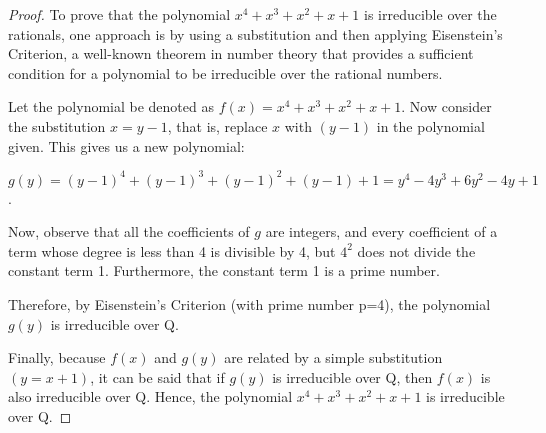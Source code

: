 \documentclass{amsart}
\theoremstyle{plain}
\begin{document}
\begin{proof}To prove that the polynomial $x^4 + x^3 + x^2 + x + 1$ is irreducible over the rationals, one approach is by using a substitution and then applying Eisenstein's Criterion, a well-known theorem in number theory that provides a sufficient condition for a polynomial to be irreducible over the rational numbers.

Let the polynomial be denoted as $f(x) = x^4 + x^3 + x^2 + x + 1$. Now consider the substitution $x = y-1$, that is, replace $x$ with $(y-1)$ in the polynomial given. This gives us a new polynomial:

$g(y) = (y-1)^4 + (y-1)^3 + (y-1)^2 + (y-1) + 1 = y^4 - 4y^3 + 6y^2 - 4y + 1$.

Now, observe that all the coefficients of $g$ are integers, and every coefficient of a term whose degree is less than 4 is divisible by 4, but $4^2$ does not divide the constant term 1. Furthermore, the constant term 1 is a prime number. 

Therefore, by Eisenstein's Criterion (with prime number p=4), the polynomial $g(y)$ is irreducible over Q.

Finally, because $f(x)$ and $g(y)$ are related by a simple substitution $(y=x+1)$, it can be said that if $g(y)$ is irreducible over Q, then $f(x)$ is also irreducible over Q. Hence, the polynomial $x^4 + x^3 + x^2 + x + 1$ is irreducible over Q.\end{proof}
\end{document}
